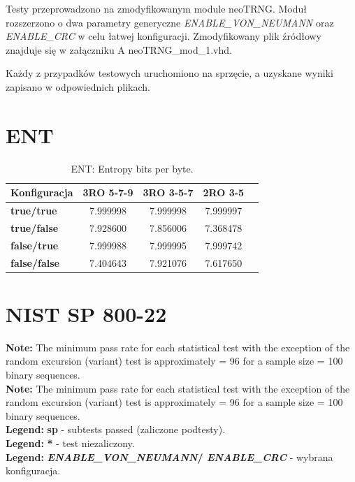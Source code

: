 \noindent Testy przeprowadzono na zmodyfikowanym module neoTRNG. Moduł rozszerzono o dwa parametry generyczne
 \textit{ENABLE\_VON\_NEUMANN} oraz \textit{ENABLE\_CRC} w celu łatwej konfiguracji. Zmodyfikowany plik źródłowy znajduje się w załączniku
  A neoTRNG\_mod\_1.vhd.

Każdy z przypadków testowych uruchomiono na sprzęcie, a uzyskane wyniki zapisano w odpowiednich plikach.


\section{ENT}

\begin{table}[H]
\centering
\caption{ENT: Entropy bits per byte.}
\label{tab:ch3_ent}
\begin{tabular}{|l|c|c|c|c|}
\hline
\textbf{Konfiguracja} & \textbf{3RO 5-7-9} & \textbf{3RO 3-5-7} & \textbf{2RO 3-5} \\ \hline
\textbf{true/true}      & 7.999998 & 7.999998 & 7.999997 \\ \hline
\textbf{true/false}     & 7.928600 & 7.856006 & 7.368478 \\ \hline
\textbf{false/true}     & 7.999988 & 7.999995 & 7.999742 \\ \hline
\textbf{false/false}    & 7.404643 & 7.921076 & 7.617650 \\ \hline
\end{tabular}
\end{table}

\section{NIST SP 800-22}

\begin{flushleft}
\small \textbf{Note:} The minimum pass rate for each statistical test with the exception of the
random excursion (variant) test is approximately = 96 for a
sample size = 100 binary sequences\cite{NIST-SP-800-22}. \\
\small \textbf{Note:} The minimum pass rate for each statistical test with the exception of the
random excursion (variant) test is approximately = 96 for a
sample size = 100 binary sequences\cite{NIST-SP-800-22}. \\
\small \textbf{Legend:} \textbf{sp} - subtests passed (zaliczone podtesty). \\
\small \textbf{Legend:} \textbf{*} - test niezaliczony. \\
\small \textbf{Legend:} \textbf{\textit{ENABLE\_VON\_NEUMANN}/ \textit{ENABLE\_CRC}} - wybrana konfiguracja.
\end{flushleft}

